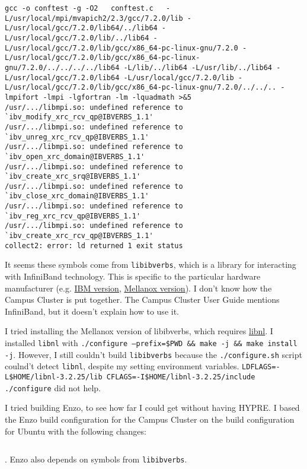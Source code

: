 \begin{verbatim}
gcc -o conftest -g -O2   conftest.c   -L/usr/local/mpi/mvapich2/2.3/gcc/7.2.0/lib -L/usr/local/gcc/7.2.0/lib64/../lib64 -L/usr/local/gcc/7.2.0/lib/../lib64 -L/usr/local/gcc/7.2.0/lib/gcc/x86_64-pc-linux-gnu/7.2.0 -L/usr/local/gcc/7.2.0/lib/gcc/x86_64-pc-linux-gnu/7.2.0/../../../../lib64 -L/lib/../lib64 -L/usr/lib/../lib64 -L/usr/local/gcc/7.2.0/lib64 -L/usr/local/gcc/7.2.0/lib -L/usr/local/gcc/7.2.0/lib/gcc/x86_64-pc-linux-gnu/7.2.0/../../.. -lmpifort -lmpi -lgfortran -lm -lquadmath >&5
/usr/.../libmpi.so: undefined reference to `ibv_modify_xrc_rcv_qp@IBVERBS_1.1'
/usr/.../libmpi.so: undefined reference to `ibv_unreg_xrc_rcv_qp@IBVERBS_1.1'
/usr/.../libmpi.so: undefined reference to `ibv_open_xrc_domain@IBVERBS_1.1'
/usr/.../libmpi.so: undefined reference to `ibv_create_xrc_srq@IBVERBS_1.1'
/usr/.../libmpi.so: undefined reference to `ibv_close_xrc_domain@IBVERBS_1.1'
/usr/.../libmpi.so: undefined reference to `ibv_reg_xrc_rcv_qp@IBVERBS_1.1'
/usr/.../libmpi.so: undefined reference to `ibv_create_xrc_rcv_qp@IBVERBS_1.1'
collect2: error: ld returned 1 exit status
\end{verbatim}

It seems these symbols come from \texttt{libibverbs}, which is a library for interacting with InfiniBand technology. This is specific to the particular hardware manufacturer (e.g. \href{https://www.ibm.com/docs/en/aix/7.2?topic=ofed-libibverbs-library}{IBM version}, \href{https://github.com/gpudirect/libibverbs}{Mellanox version}). I don't know how the Campus Cluster is put together. The Campus Cluster User Guide mentions InfiniBand, but it doesn't explain how to use it.

I tried installing the Mellanox version of libibverbs, which requires \href{https://www.infradead.org/~tgr/libnl/}{libnl}. I installed \texttt{libnl} with \texttt{./configure --prefix=\${PWD} \&\& make -j \&\& make install -j}. However, I still couldn't build \texttt{libibverbs} because the \texttt{./configure.sh} script coulnd't detect \texttt{libnl}, despite my setting environment variables. \texttt{LDFLAGS=-L\${HOME}/libnl-3.2.25/lib CFLAGS=-I\${HOME}/libnl-3.2.25/include ./configure} did not help.

I tried building Enzo, to see how far I could get without having HYPRE. I based the Enzo build configuration for the Campus Cluster on the build configuration for Ubuntu with the following changes:

\inputminted[fontsize=\footnotesize,breaklines]{diff}{/home/sam/box/astro/project/code/diff}. Enzo also depends on symbols from \texttt{libibverbs}.

